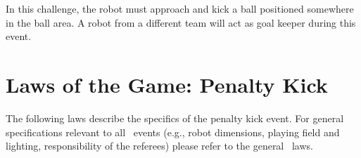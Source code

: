 \documentclass[12pt]{hurocup}
\begin{document}
In this challenge, the robot must approach and kick a ball positioned
somewhere in the ball area. A robot from a different team will act as
goal keeper during this event.

\section{Laws of the Game: Penalty Kick}
\label{sec:laws-penalty-kicks}

The following laws describe the specifics of the penalty kick event. For
general specifications relevant to all \HuroCup\ events (e.g., robot
dimensions, playing field and lighting, responsibility of the
referees) please refer to the general \HuroCup\ laws.

\label{pk-field}
\end{document}
